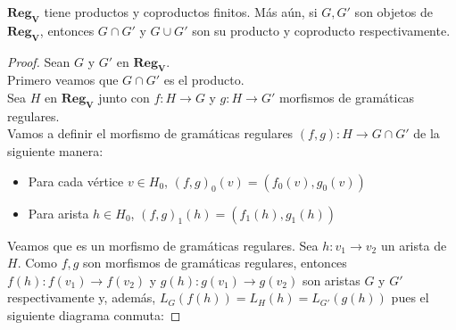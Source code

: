 \documentclass[../main.tex]{subfiles}
\begin{document}
 \begin{prop}
	$\mathbf{Reg_V}$ tiene productos y coproductos finitos. Más aún, si $G, G'$ son objetos de $\mathbf{Reg_V}$, entonces $G\cap G'$ y $G\cup G'$ son su producto y coproducto respectivamente. 
 \end{prop}
 \begin{proof}
 	Sean $G$ y $G'$ en $\mathbf{Reg_V}$. \\
 	Primero veamos que $G\cap G'$ es el producto. \\
 	Sea $H$ en $\mathbf{Reg_V}$ junto con $f:H \to G$ y $g:H \to G'$ morfismos de gramáticas regulares. \\
 	Vamos a definir el morfismo de gramáticas regulares $(f,g):H \to G\cap G'$ de la siguiente manera:
 	\begin{itemize}
		\item Para cada vértice $v \in H_0$, $(f,g)_0(v)=(f_0(v),g_0(v))$
		\item Para arista $h\in H_0$, $(f,g)_1(h)=(f_1(h),g_1(h))$
 	\end{itemize}
 	Veamos que es un morfismo de gramáticas regulares. Sea $h:v_1 \to v_2$ un arista de $H$. Como $f,g$ son morfismos de gramáticas regulares, entonces $f(h): f(v_1)\to f(v_2)$ y $g(h): g(v_1)\to g(v_2)$ son aristas $G$ y $G'$ respectivamente y, además, $L_G(f(h))=L_H(h)=L_{G'}(g(h))$ pues el siguiente diagrama conmuta: 
 	

\end{proof}
\end{document}
